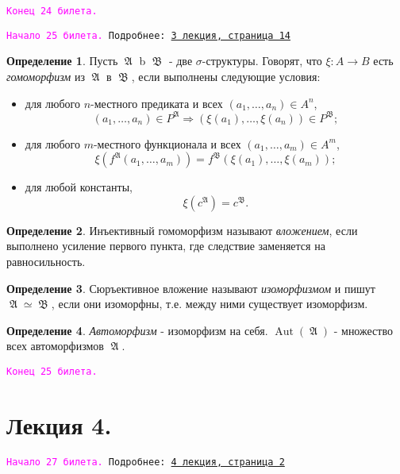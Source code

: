 \documentclass[a4paper,100pt]{article}
\theoremstyle{indented}
\theoremstyle{definition}
\newtheorem{defn}{Определение}
\theoremstyle{remark}
\DeclareMathOperator{\ra}{\rightarrow}
\DeclareMathOperator{\Ra}{\Rightarrow}
\DeclareMathOperator{\Aut}{Aut}
\DeclareMathOperator{\GA}{\mathfrak{A}}
\DeclareMathOperator{\GB}{\mathfrak{B}}
\begin{document}
\texttt{\textcolor{magenta}{Конец 24 билета.}} 

\hrulefill

\texttt{\hypertarget{b25}{\textcolor{magenta}{Начало 25 билета.}} Подробнее: \href{http://www.mi-ras.ru/~speranski/courses/logic-1-2021-spring/slides_3.pdf}{3 лекция, страница 14}} 

\begin{defn}
  Пусть $\GA$ b $\GB$ - две $\sigma$-структуры. Говорят, что $\xi: A\ra B$ есть \textit{гомоморфизм} из $\GA$ в $\GB$, если выполнены следующие условия:

  \begin{itemize}
    \item для любого $n$-местного предиката и всех $(a_1, \ldots, a_n)\in A^n$, 
    \[
      (a_1, \ldots, a_n)\in P^{\GA} \Ra (\xi(a_1), \ldots, \xi(a_n)) \in P^{\GB}; 
    \]
    \item для любого $m$-местного функционала и всех $(a_1, \ldots, a_m)\in A^m$, 
    \[
      \xi(f^{\GA}(a_1, \ldots, a_m))=f^{\GB}(\xi(a_1), \ldots, \xi(a_m)); 
    \]
    \item для любой константы, 
    \[
      \xi(c^{\GA})=c^{\GB}.
    \]
  \end{itemize}
\end{defn}

\begin{defn}
  Инъективный гомоморфизм называют \textit{вложением}, если выполнено усиление первого пункта, где следствие заменяется на равносильность.
\end{defn}

\begin{defn}
  Сюръективное вложение называют \textit{изоморфизмом} и пишут $\GA \simeq \GB$, если они изоморфны, т.е. между ними существует изоморфизм.
\end{defn}

\begin{defn}
  \textit{Автоморфизм} - изоморфизм на себя. $\Aut(\GA)$ - множество всех автоморфизмов $\GA$. 
\end{defn}

\texttt{\textcolor{magenta}{Конец 25 билета.}} 

\hrulefill

\section{Лекция 4.} 

\hrulefill

\texttt{\hypertarget{b27}{\textcolor{magenta}{Начало 27 билета.}} Подробнее: \href{http://www.mi-ras.ru/~speranski/courses/logic-1-2021-spring/slides_4.pdf}{4 лекция, страница 2}} 
\end{document}
